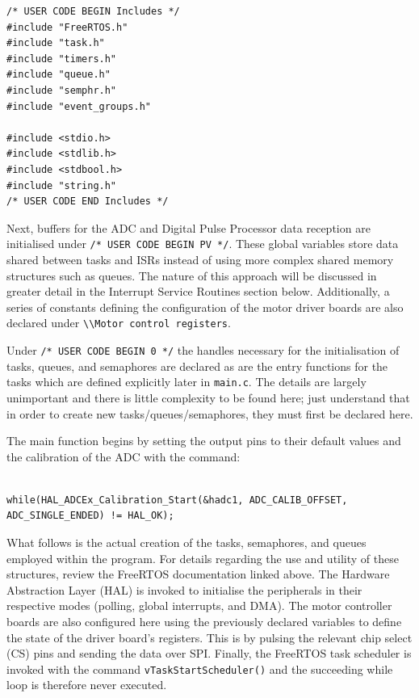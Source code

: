 \begin{listing}
\begin{verbatim}
/* USER CODE BEGIN Includes */
#include "FreeRTOS.h"
#include "task.h"
#include "timers.h"
#include "queue.h"
#include "semphr.h"
#include "event_groups.h"

#include <stdio.h>
#include <stdlib.h>
#include <stdbool.h>
#include "string.h"
/* USER CODE END Includes */
\end{verbatim}
\label{listing:includes}
\end{listing}

Next, buffers for the ADC and Digital Pulse Processor data reception are initialised under \verb|/* USER CODE BEGIN PV */|. These global variables store data shared between tasks and ISRs instead of using more complex shared memory structures such as queues. The nature of this approach will be discussed in greater detail in the Interrupt Service Routines section below. Additionally, a series of constants defining the configuration of the motor driver boards are also declared under \verb|\\Motor control registers|.

Under \verb|/* USER CODE BEGIN 0 */| the handles necessary for the initialisation of tasks, queues, and semaphores are declared as are the entry functions for the tasks which are defined explicitly later in \verb|main.c|. The details are largely unimportant and there is little complexity to be found here; just understand that in order to create new tasks/queues/semaphores, they must first be declared here.

The main function begins by setting the output pins to their default values and the calibration of the ADC with the command:


\begin{listing}
\begin{verbatim}

while(HAL_ADCEx_Calibration_Start(&hadc1, ADC_CALIB_OFFSET, ADC_SINGLE_ENDED) != HAL_OK);

\end{verbatim}
\label{listing:ADC-calib}
\end{listing}


What follows is the actual creation of the tasks, semaphores, and queues employed within the program. For details regarding the use and utility of these structures, review the FreeRTOS documentation linked above. The Hardware Abstraction Layer (HAL) is invoked to initialise the peripherals in their respective modes (polling, global interrupts, and DMA). The motor controller boards are also configured here using the previously declared variables to define the state of the driver board’s registers. This is by pulsing the relevant chip select (CS) pins and sending the data over SPI. Finally, the FreeRTOS task scheduler is invoked with the command \verb|vTaskStartScheduler()| and the succeeding while loop is therefore never executed.


